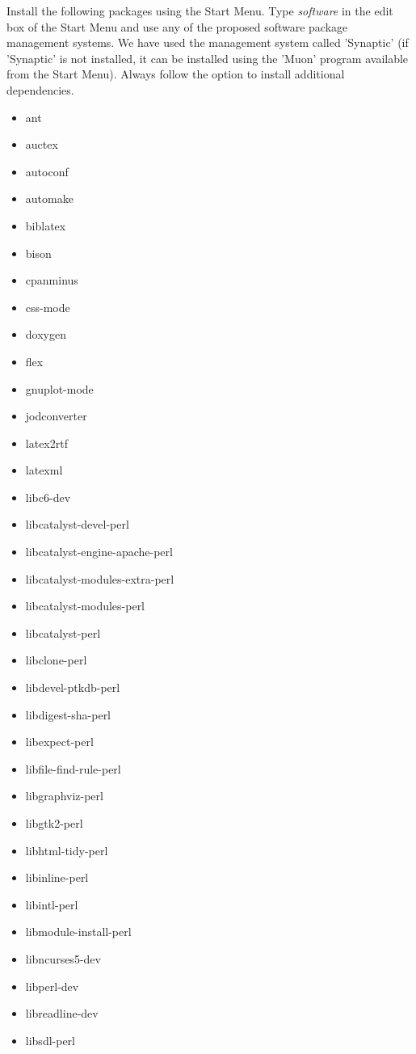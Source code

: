 \documentclass[12pt]{article}
\begin{document}
Install the following packages using the Start Menu.  Type
  {\it software} in the edit box of the Start Menu and use any of the
  proposed software package management systems.  We have used the
  management system called 'Synaptic' (if 'Synaptic' is not installed,
  it can be installed using the 'Muon' program available from the
  Start Menu).  Always follow the option to install additional
  dependencies.
  \begin{itemize}
  \item ant
  \item auctex
  \item autoconf
  \item automake
  \item biblatex
  \item bison
  \item cpanminus
  \item css-mode
  \item doxygen
  \item flex
  \item gnuplot-mode
  \item jodconverter
  \item latex2rtf
  \item latexml
  \item libc6-dev
  \item libcatalyst-devel-perl
  \item libcatalyst-engine-apache-perl
  \item libcatalyst-modules-extra-perl
  \item libcatalyst-modules-perl
  \item libcatalyst-perl
  \item libclone-perl
  \item libdevel-ptkdb-perl
  \item libdigest-sha-perl
  \item libexpect-perl
  \item libfile-find-rule-perl
  \item libgraphviz-perl
  \item libgtk2-perl
  \item libhtml-tidy-perl
  \item libinline-perl
  \item libintl-perl
  \item libmodule-install-perl
  \item libncurses5-dev
  \item libperl-dev
  \item libreadline-dev
  \item libsdl-perl

\end{itemize}
\end{document}
